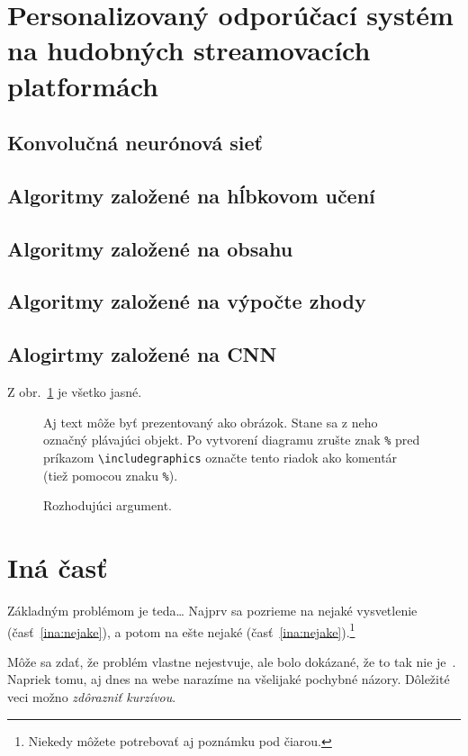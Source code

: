 \documentclass[10pt,twoside,slovak,a4paper, colorinlistoftodos]{article}
\begin{document}
\section{Personalizovaný odporúčací systém na hudobných streamovacích platformách} \label{1}
\subsection{Konvolučná neurónová sieť} \label{1:1}
\subsection{Algoritmy založené na hĺbkovom učení} \label{1:2}
\subsection{Algoritmy založené na obsahu} \label{1:3}
\subsection{Algoritmy založené na výpočte zhody} \label{1:4}
\subsection{Alogirtmy založené na CNN} \label{1:1}

Z obr.~\ref{f:rozhod} je všetko jasné. 

\begin{figure}[tbh]
\centering
Aj text môže byť prezentovaný ako obrázok. Stane sa z neho označný plávajúci objekt. Po vytvorení diagramu zrušte znak \texttt{\%} pred príkazom \verb|\includegraphics| označte tento riadok ako komentár (tiež pomocou znaku \texttt{\%}).
\caption{Rozhodujúci argument.}
\label{f:rozhod}
\end{figure}



\section{Iná časť} \label{ina}

Základným problémom je teda\ldots{} Najprv sa pozrieme na nejaké vysvetlenie (časť~\ref{ina:nejake}), a potom na ešte nejaké (časť~\ref{ina:nejake}).\footnote{Niekedy môžete potrebovať aj poznámku pod čiarou.}

Môže sa zdať, že problém vlastne nejestvuje\cite{Coplien:MPD}, ale bolo dokázané, že to tak nie je~\cite{Czarnecki:Staged, Czarnecki:Progress}. Napriek tomu, aj dnes na webe narazíme na všelijaké pochybné názory\cite{PLP-Framework}. Dôležité veci možno \emph{zdôrazniť kurzívou}.
\end{document}
